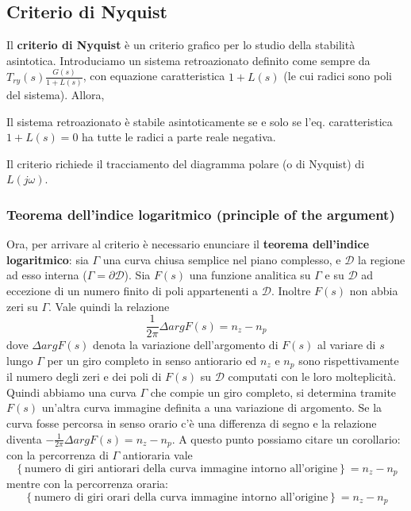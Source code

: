 \documentclass[11pt]{article}
\begin{document}
\subsection{Criterio di Nyquist}
Il \textbf{criterio di Nyquist} è un criterio grafico per lo studio della stabilità asintotica. Introduciamo un sistema retroazionato definito come sempre da $T_{ry}(s)\frac{G(s)}{1+L(s)}$, con equazione caratteristica $1+L(s)$ (le cui radici sono poli del sistema). Allora,
\begin{center}
    Il sistema retroazionato è stabile asintoticamente se e solo se l'eq. caratteristica $1+L(s)=0$ ha tutte le radici a parte reale negativa.
\end{center}
Il criterio richiede il tracciamento del diagramma polare (o di Nyquist) di $L(j\omega)$.
\subsubsection{Teorema dell'indice logaritmico (principle of the argument)}
Ora, per arrivare al criterio è necessario enunciare il \textbf{teorema dell'indice logaritmico}: sia $\Gamma$ una curva chiusa semplice nel piano complesso, e $\mathcal{D}$ la regione ad esso interna ($\Gamma = \partial \mathcal{D}$). Sia $F(s)$ una funzione analitica su $\Gamma$ e su $\mathcal{D}$ ad eccezione di un numero finito di poli appartenenti a $\mathcal{D}$. Inoltre $F(s)$ non abbia zeri su $\Gamma$. Vale quindi la relazione
\begin{displaymath}
    \frac{1}{2\pi} \Delta arg F(s) = n_z - n_p
\end{displaymath}
dove $\Delta arg F(s)$ denota la variazione dell'argomento di $F(s)$ al variare di $s$ lungo $\Gamma$ per un giro completo in senso antiorario ed $n_z$ e $n_p$ sono rispettivamente il numero degli zeri e dei poli di $F(s)$ su $\mathcal{D}$ computati con le loro molteplicità. Quindi abbiamo una curva $\Gamma$ che compie un giro completo, si determina tramite $F(s)$ un'altra curva immagine definita a una variazione di argomento. Se la curva fosse percorsa in senso orario c'è una differenza di segno e la relazione diventa $-\frac{1}{2\pi} \Delta arg F(s) = n_z - n_p$. A questo punto possiamo citare un corollario: con la percorrenza di $\Gamma$ antioraria vale
\begin{displaymath}
    \left\{\textrm{numero di giri antiorari della curva immagine intorno all'origine}\right\} = n_z-n_p
\end{displaymath}
mentre con la percorrenza oraria:
\begin{displaymath}
    \left\{\textrm{numero di giri orari della curva immagine intorno all'origine}\right\} = n_z-n_p
\end{displaymath}
\end{document}
